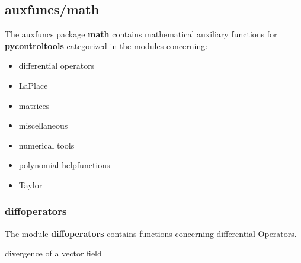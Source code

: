\documentclass[letterpaper,10pt,english]{sphinxmanual}
\begin{document}

\begin{fulllineitems}
\label{pycontroltools:trajectories.trajectories.make_pw}
\end{fulllineitems}



\subsection{\textbf{auxfuncs/math}}
\label{pycontroltools:auxfuncs-math}
The auxfuncs package \textbf{math} contains mathematical auxiliary functions for
\textbf{pycontroltools} categorized in the modules concerning:
\begin{itemize}
\item {} 
differential operators

\item {} 
LaPlace

\item {} 
matrices

\item {} 
miscellaneous

\item {} 
numerical tools

\item {} 
polynomial helpfunctions

\item {} 
Taylor

\end{itemize}


\subsubsection{\textbf{diffoperators}}
\label{pycontroltools:diffoperators}
The module \textbf{diffoperators} contains functions concerning differential
Operators.
\label{pycontroltools:module-auxfuncs.math.diffoperators}\label{pycontroltools:module-diffoperators}

\begin{fulllineitems}
\label{pycontroltools:auxfuncs.math.diffoperators.div}
divergence of a vector field

\end{fulllineitems}
\end{document}
